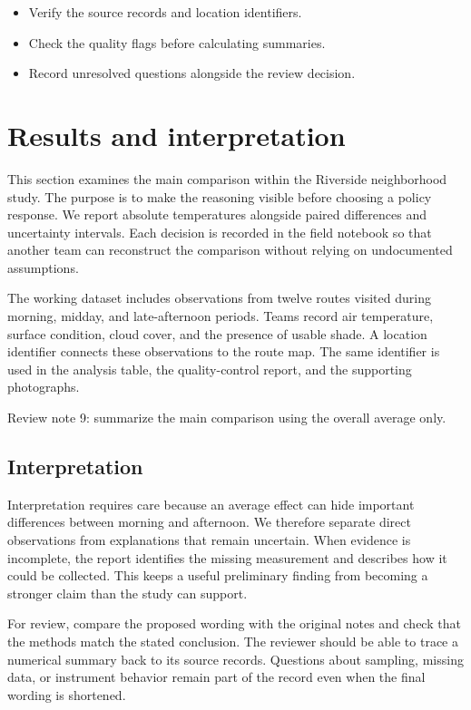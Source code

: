 \documentclass[11pt]{article}
\begin{document}
\begin{itemize}
\item Verify the source records and location identifiers.
\item Check the quality flags before calculating summaries.
\item Record unresolved questions alongside the review decision.
\end{itemize}

\section{Results and interpretation}
This section examines the main comparison within the Riverside neighborhood study. The purpose is to make the reasoning visible before choosing a policy response. We report absolute temperatures alongside paired differences and uncertainty intervals. Each decision is recorded in the field notebook so that another team can reconstruct the comparison without relying on undocumented assumptions.

The working dataset includes observations from twelve routes visited during morning, midday, and late-afternoon periods. Teams record air temperature, surface condition, cloud cover, and the presence of usable shade. A location identifier connects these observations to the route map. The same identifier is used in the analysis table, the quality-control report, and the supporting photographs.

Review note 9: summarize the main comparison using the overall average only.

\subsection{Interpretation}
Interpretation requires care because an average effect can hide important differences between morning and afternoon. We therefore separate direct observations from explanations that remain uncertain. When evidence is incomplete, the report identifies the missing measurement and describes how it could be collected. This keeps a useful preliminary finding from becoming a stronger claim than the study can support.

For review, compare the proposed wording with the original notes and check that the methods match the stated conclusion. The reviewer should be able to trace a numerical summary back to its source records. Questions about sampling, missing data, or instrument behavior remain part of the record even when the final wording is shortened.
\end{document}
